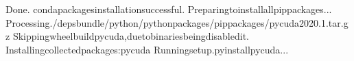 \documentclass[a4paper,11pt,english]{sphinxmanual}
\begin{document}
\begin{sphinxVerbatim}[commandchars=\\\{\}]
\PYGZhy{}\PYGZhy{}\PYGZhy{}\PYGZhy{}\PYGZhy{}\PYGZhy{}\PYGZhy{}\PYGZhy{}\PYGZhy{}\PYGZhy{}\PYGZhy{}\PYGZhy{}\PYGZhy{}\PYGZhy{}\PYGZhy{}\PYGZhy{}\PYGZhy{}\PYGZhy{}\PYGZhy{}\PYGZhy{}\PYGZhy{}\PYGZhy{}\PYGZhy{}\PYGZhy{}\PYGZhy{}\PYGZhy{}\PYGZhy{}\PYGZhy{}\PYGZhy{}\PYGZhy{}\PYGZhy{}\PYGZhy{}\PYGZhy{}\PYGZhy{}\PYGZhy{}\PYGZhy{}\PYGZhy{}\PYGZhy{}\PYGZhy{}\PYGZhy{}\PYGZhy{}\PYGZhy{}\PYGZhy{}\PYGZhy{}\PYGZhy{}\PYGZhy{}\PYGZhy{}\PYGZhy{}\PYGZhy{}\PYGZhy{}\PYGZhy{}\PYGZhy{}\PYGZhy{}\PYGZhy{}\PYGZhy{}\PYGZhy{}\PYGZhy{}\PYGZhy{}\PYGZhy{}\PYGZhy{}\PYGZhy{}\PYGZhy{}\PYGZhy{}\PYGZhy{}\PYGZhy{}\PYGZhy{}\PYGZhy{}\PYGZhy{}\PYGZhy{}\PYGZhy{}\PYGZhy{}\PYGZhy{}
Done.
condapackagesinstallationsuccessful.
\PYGZhy{}\PYGZhy{}\PYGZhy{}\PYGZhy{}\PYGZhy{}\PYGZhy{}\PYGZhy{}\PYGZhy{}\PYGZhy{}\PYGZhy{}\PYGZhy{}\PYGZhy{}\PYGZhy{}\PYGZhy{}\PYGZhy{}\PYGZhy{}\PYGZhy{}\PYGZhy{}\PYGZhy{}\PYGZhy{}\PYGZhy{}\PYGZhy{}\PYGZhy{}\PYGZhy{}\PYGZhy{}\PYGZhy{}\PYGZhy{}\PYGZhy{}\PYGZhy{}\PYGZhy{}\PYGZhy{}\PYGZhy{}\PYGZhy{}\PYGZhy{}\PYGZhy{}\PYGZhy{}\PYGZhy{}\PYGZhy{}\PYGZhy{}\PYGZhy{}\PYGZhy{}\PYGZhy{}\PYGZhy{}\PYGZhy{}\PYGZhy{}\PYGZhy{}\PYGZhy{}\PYGZhy{}\PYGZhy{}\PYGZhy{}\PYGZhy{}\PYGZhy{}\PYGZhy{}\PYGZhy{}\PYGZhy{}\PYGZhy{}\PYGZhy{}\PYGZhy{}\PYGZhy{}\PYGZhy{}\PYGZhy{}\PYGZhy{}\PYGZhy{}\PYGZhy{}\PYGZhy{}\PYGZhy{}\PYGZhy{}\PYGZhy{}\PYGZhy{}\PYGZhy{}\PYGZhy{}\PYGZhy{}
Preparingtoinstallallpippackages...
\PYGZhy{}\PYGZhy{}\PYGZhy{}\PYGZhy{}\PYGZhy{}\PYGZhy{}\PYGZhy{}\PYGZhy{}\PYGZhy{}\PYGZhy{}\PYGZhy{}\PYGZhy{}\PYGZhy{}\PYGZhy{}\PYGZhy{}\PYGZhy{}\PYGZhy{}\PYGZhy{}\PYGZhy{}\PYGZhy{}\PYGZhy{}\PYGZhy{}\PYGZhy{}\PYGZhy{}\PYGZhy{}\PYGZhy{}\PYGZhy{}\PYGZhy{}\PYGZhy{}\PYGZhy{}\PYGZhy{}\PYGZhy{}\PYGZhy{}\PYGZhy{}\PYGZhy{}\PYGZhy{}\PYGZhy{}\PYGZhy{}\PYGZhy{}\PYGZhy{}\PYGZhy{}\PYGZhy{}\PYGZhy{}\PYGZhy{}\PYGZhy{}\PYGZhy{}\PYGZhy{}\PYGZhy{}\PYGZhy{}\PYGZhy{}\PYGZhy{}\PYGZhy{}\PYGZhy{}\PYGZhy{}\PYGZhy{}\PYGZhy{}\PYGZhy{}\PYGZhy{}\PYGZhy{}\PYGZhy{}\PYGZhy{}\PYGZhy{}\PYGZhy{}\PYGZhy{}\PYGZhy{}\PYGZhy{}\PYGZhy{}\PYGZhy{}\PYGZhy{}\PYGZhy{}\PYGZhy{}\PYGZhy{}
Processing./deps\PYGZus{}bundle/python/python\PYGZus{}packages/pip\PYGZus{}packages/pycuda\PYGZhy{}2020.1.tar.gz
Skippingwheelbuildpycuda,duetobinariesbeingdisabledit.
Installingcollectedpackages:pycuda
Runningsetup.pyinstallpycuda...

\end{sphinxVerbatim}
\end{document}
